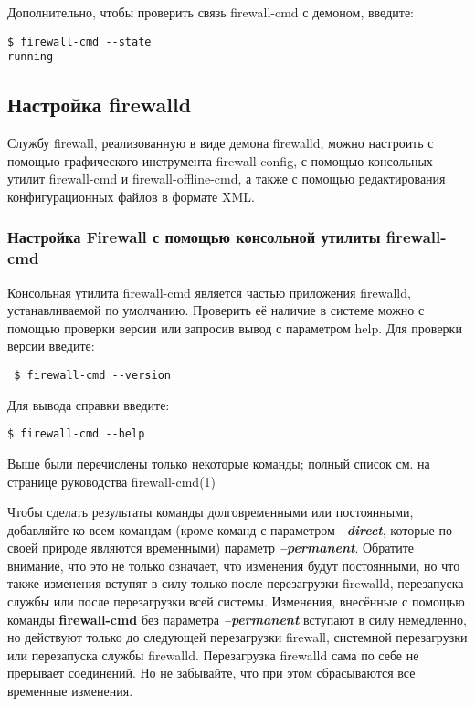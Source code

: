 \documentclass[a4paper,10pt,twoside]{article}
\begin{document}
Дополнительно, чтобы проверить связь firewall-cmd с демоном, введите: 
\begin{verbatim}
$ firewall-cmd --state
running
\end{verbatim} 


\subsection{Настройка firewalld}
Службу firewall, реализованную в виде демона firewalld, можно настроить с помощью графического инструмента firewall-config, с помощью консольных утилит firewall-cmd и firewall-offline-cmd, а также с помощью редактирования конфигурационных файлов в формате XML.



\subsubsection{Настройка Firewall с помощью консольной утилиты firewall-cmd}
Консольная утилита firewall-cmd является частью приложения firewalld, устанавливаемой по умолчанию. Проверить её наличие в системе можно с помощью проверки версии или запросив вывод с параметром help. Для проверки версии введите:
\begin{verbatim}
 $ firewall-cmd --version
\end{verbatim} 

Для вывода справки введите:
\begin{verbatim}
$ firewall-cmd --help
\end{verbatim}

Выше были перечислены только некоторые команды; полный список см. на странице руководства firewall-cmd(1)


Чтобы сделать результаты команды долговременными или постоянными, добавляйте ко всем командам (кроме команд с параметром \textit{\textbf{--direct}}, которые по своей природе являются временными) параметр \textit{\textbf{--permanent}}. Обратите внимание, что это не только означает, что изменения будут постоянными, но что также изменения вступят в силу только после перезагрузки firewalld,  перезапуска службы или после перезагрузки всей системы. Изменения, внесённые с помощью команды \textbf{firewall-cmd} без параметра \textit{\textbf{--permanent}} вступают в силу немедленно, но действуют только до следующей перезагрузки firewall, системной перезагрузки или перезапуска службы firewalld. Перезагрузка firewalld сама по себе не прерывает соединений. Но не забывайте, что при этом сбрасываются все временные изменения.
\end{document}
